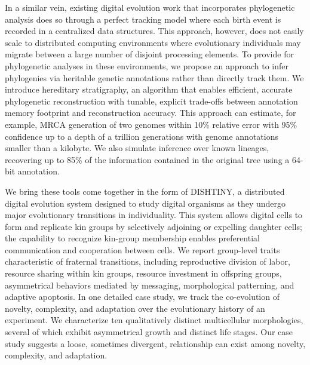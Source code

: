 In a similar vein, existing digital evolution work that incorporates phylogenetic analysis does so through a perfect tracking model where each birth event is recorded in a centralized data structures.
This approach, however, does not easily scale to distributed computing environments where evolutionary individuals may migrate between a large number of disjoint processing elements.
To provide for phylogenetic analyses in these environments, we propose an approach to infer phylogenies via heritable genetic annotations rather than directly track them.
We introduce hereditary stratigraphy, an algorithm that enables efficient, accurate phylogenetic reconstruction with tunable, explicit trade-offs between annotation memory footprint and reconstruction accuracy.
This approach can estimate, for example, MRCA generation of two genomes within 10\% relative error with 95\% confidence up to a depth of a trillion generations with genome annotations smaller than a kilobyte.
We also simulate inference over known lineages, recovering up to 85\% of the information contained in the original tree using a 64-bit annotation.

We bring these tools come together in the form of DISHTINY, a distributed digital evolution system designed to study digital organisms as they undergo major evolutionary transitions in individuality.
This system allows digital cells to form and replicate kin groups by selectively adjoining or expelling daughter cells;
the capability to recognize kin-group membership enables preferential communication and cooperation between cells.
We report group-level traits characteristic of fraternal transitions, including reproductive division of labor, resource sharing within kin groups, resource investment in offspring groups, asymmetrical behaviors mediated by messaging, morphological patterning, and adaptive apoptosis.
In one detailed case study, we track the co-evolution of novelty, complexity, and adaptation over the evolutionary history of an experiment.
We characterize ten qualitatively distinct multicellular morphologies, several of which exhibit asymmetrical growth and distinct life stages.
Our case study suggests a loose, sometimes divergent, relationship can exist among novelty, complexity, and adaptation.
